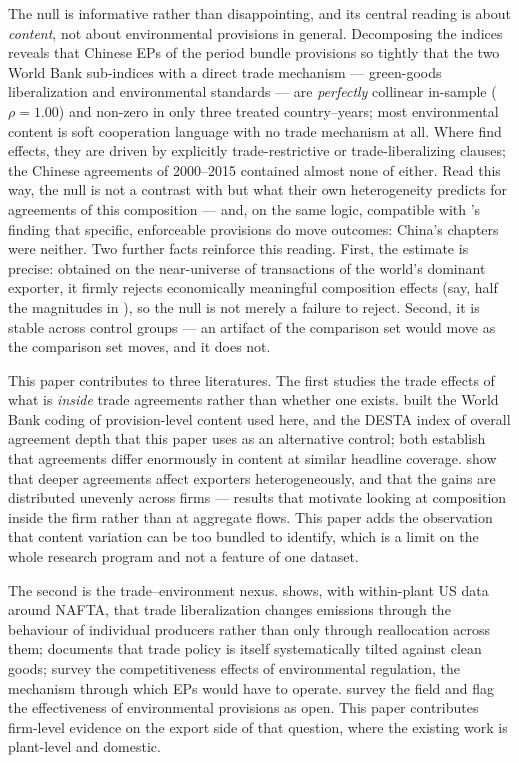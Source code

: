 \documentclass[12pt]{article}
\begin{document}
The null is informative rather than disappointing, and its central reading is about
\emph{content}, not about environmental provisions in general. Decomposing the indices
reveals that Chinese EPs of the period bundle provisions so tightly that the two World
Bank sub-indices with a direct trade mechanism --- green-goods liberalization and
environmental standards --- are \emph{perfectly} collinear in-sample ($\rho = 1.00$) and
non-zero in only three treated country--years; most environmental content is soft
cooperation language with no trade mechanism at all. Where \citet{brandi2020} find
effects, they are driven by explicitly trade-restrictive or trade-liberalizing clauses;
the Chinese agreements of 2000--2015 contained almost none of either. Read this way, the
null is not a contrast with \citet{brandi2020} but what their own heterogeneity predicts
for agreements of this composition --- and, on the same logic, compatible with
\citet{abman2024}'s finding that specific, enforceable provisions do move outcomes: China's
chapters were neither. Two further facts reinforce this reading. First, the estimate is
precise: obtained on the near-universe of transactions of the world's dominant exporter,
it firmly rejects economically meaningful composition effects (say, half the magnitudes
in \citealp{brandi2020}), so the null is not merely a failure to reject. Second, it is
stable across control groups --- an artifact of the comparison set would move as the
comparison set moves, and it does not.

This paper contributes to three literatures. The first studies the trade effects of what
is \emph{inside} trade agreements rather than whether one exists. \citet{hofmann2017}
built the World Bank coding of provision-level content used here, and \citet{dur2014} the
DESTA index of overall agreement depth that this paper uses as an alternative control;
both establish that agreements differ enormously in content at similar headline
coverage. \citet{neri2023} show that deeper agreements affect exporters heterogeneously,
and \citet{baccini2017} that the gains are distributed unevenly across firms --- results
that motivate looking at composition inside the firm rather than at aggregate flows. This
paper adds the observation that content variation can be too bundled to identify, which is
a limit on the whole research program and not a feature of one dataset.

The second is the trade--environment nexus. \citet{cherniwchan2017} shows, with
within-plant US data around NAFTA, that trade liberalization changes emissions through the
behaviour of individual producers rather than only through reallocation across them;
\citet{shapiro2021} documents that trade policy is itself systematically tilted against
clean goods; \citet{dechezlepretre2017} survey the competitiveness effects of environmental
regulation, the mechanism through which EPs would have to operate. \citet{copeland2022}
survey the field and flag the effectiveness of environmental provisions as open. This
paper contributes firm-level evidence on the export side of that question, where the
existing work is plant-level and domestic.
\end{document}
